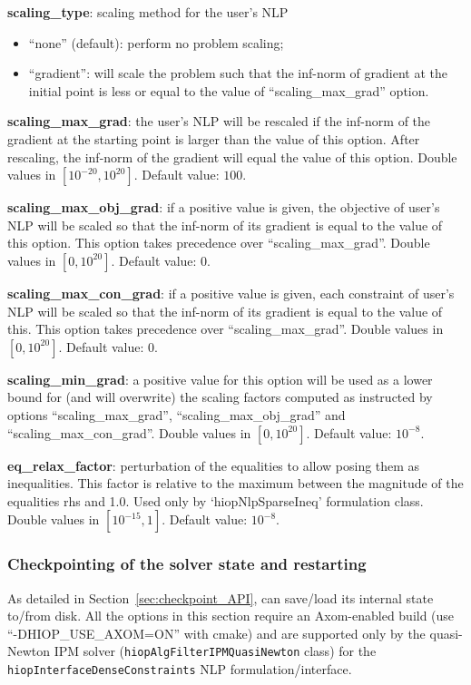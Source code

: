 \noindent \textbf{scaling\_type}: scaling method for the user's NLP
\begin{itemize}
\item ``none'' (default): perform no problem scaling;
\item ``gradient'':  will scale the problem such that the inf-norm of gradient at the initial point is less or equal to the value of ``scaling\_max\_grad'' option.
\end{itemize}
\medskip

\noindent \textbf{scaling\_max\_grad}: the user's NLP will be rescaled if the inf-norm of the gradient at the starting point is larger than the value of this option. After rescaling, the inf-norm of the gradient will equal the value of this option. Double values in $[10^{-20}, 10^{20}]$. Default value: $100$.
\medskip

\noindent \textbf{scaling\_max\_obj\_grad}: if a positive value is given, the objective of user's NLP will be scaled so that the inf-norm of its gradient is equal to the value of this option. This option takes precedence over ``scaling\_max\_grad''. Double values in $[0, 10^{20}]$. Default value: $0$.
\medskip

\noindent \textbf{scaling\_max\_con\_grad}: if a positive value is given, each constraint of user's NLP will be scaled so that the inf-norm of its gradient is equal to the value of this. This option takes precedence over ``scaling\_max\_grad''. Double values in $[0, 10^{20}]$. Default value: $0$.
\medskip

\noindent \textbf{scaling\_min\_grad}: a positive value for this option will be used as a lower bound for (and will overwrite) the scaling factors computed as instructed by options ``scaling\_max\_grad'', ``scaling\_max\_obj\_grad'' and ``scaling\_max\_con\_grad''. Double values in $[0, 10^{20}]$. Default value: $10^{-8}$.
\medskip

\noindent \textbf{eq\_relax\_factor}: perturbation of the equalities to allow posing them as inequalities. This factor is relative to the maximum between the magnitude of the equalities rhs and 1.0. Used only by `hiopNlpSparseIneq' formulation class. Double values in $[10^{-15}, 1]$. Default value: $10^{-8}$.
\medskip


\subsubsection{Checkpointing of the solver state and restarting}\label{sec:checkpoint}
As detailed in Section~\ref{sec:checkpoint_API}, \Hi can save/load its internal state to/from disk. All the options in this section require an Axom-enabled build (use ``-DHIOP\_USE\_AXOM=ON'' with cmake) and are supported only by the quasi-Newton IPM solver (\texttt{hiopAlgFilterIPMQuasiNewton} class) for the \texttt{hiopInterfaceDenseConstraints} NLP formulation/interface.

